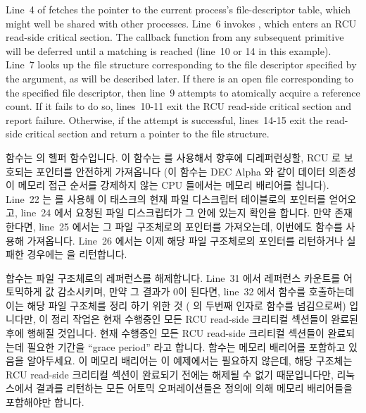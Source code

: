 Line~4 of  fetches the pointer to the current
process's file-descriptor table, which might well be shared
with other processes.
Line~6 invokes , which
enters an RCU read-side critical section.
The callback function from any subsequent  primitive
will be deferred until a matching  is reached
(line~10 or 14 in this example).
Line~7 looks up the file structure corresponding to the file
descriptor specified by the  argument, as will be
described later.
If there is an open file corresponding to the specified file descriptor,
then line~9 attempts to atomically acquire a reference count.
If it fails to do so, lines~10-11 exit the RCU read-side critical
section and report failure.
Otherwise, if the attempt is successful, lines~14-15 exit the read-side
critical section and return a pointer to the file structure.
\fi

 함수는  의 헬퍼 함수입니다.
이 함수는  를 사용해서 향후에 디레퍼런싱할, RCU 로
보호되는 포인터를 안전하게 가져옵니다 (이 함수는 DEC Alpha 와 같이 데이터
의존성이 메모리 접근 순서를 강제하지 않는 CPU 들에서는 메모리 배리어를 칩니다).
Line~22 는  를 사용해 이 태스크의 현재 파일 디스크립터
테이블로의 포인터를 얻어오고, line~24 에서 요청된 파일 디스크립터가 그 안에
있는지 확인을 합니다.
만약 존재한다면, line~25 에서는 그 파일 구조체로의 포인터를 가져오는데,
이번에도  함수를 사용해 가져옵니다.
Line~26 에서는 이제 해당 파일 구조체로의 포인터를 리턴하거나 실패한 경우에는
 을 리턴합니다.
\iffalse

The \co{fcheck_files()} primitive is a helper function for
\co{fget()}.
It uses the \co{rcu_dereference()} primitive to safely fetch an
RCU-protected pointer for later dereferencing (this emits a
memory barrier on CPUs such as DEC Alpha in which data dependencies
do not enforce memory ordering).
Line~22 uses \co{rcu_dereference()} to fetch a pointer to this
task's current file-descriptor table,
and line~24 checks to see if the specified file descriptor is in range.
If so, line~25 fetches the pointer to the file structure, again using
the \co{rcu_dereference()} primitive.
Line~26 then returns a pointer to the file structure or \co{NULL}
in case of failure.
\fi

 함수는 파일 구조체로의 레퍼런스를 해제합니다.
Line~31 에서 레퍼런스 카운트를 어토믹하게 값 감소시키며, 만약 그 결과가 0이
된다면, line~32 에서  함수를 호출하는데 이는 해당 파일 구조체를
정리 하기 위한 것 ( 의 두번째 인자로  함수를
넘김으로써) 입니다만, 이 정리 작업은 현재 수행중인 모든 RCU read-side 크리티컬
섹션들이 완료된 후에 행해질 것입니다.
현재 수행중인 모든 RCU read-side 크리티컬 섹션들이 완료되는데 필요한 기간을
``grace period'' 라고 합니다.
 함수는 메모리 배리어를 포함하고 있음을 알아두세요.
이 메모리 배리어는 이 예제에서는 필요하지 않은데, 해당 구조체는 RCU read-side
크리티컬 섹션이 완료되기 전에는 해제될 수 없기 때문입니다만, 리눅스에서 결과를
리턴하는 모든 어토믹 오퍼레이션들은 정의에 의해 메모리 배리어들을 포함해야만
합니다.

